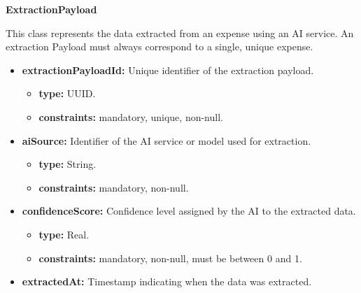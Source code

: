 \textbf{ExtractionPayload}

This class represents the data extracted from an expense using an AI service. An extraction Payload must always correspond to a single, unique expense.

\begin{itemize} [leftmargin=0.75cm, noitemsep, label=\textbullet]

    \item \textbf{extractionPayloadId:} Unique identifier of the extraction payload.
    
    \begin{itemize} [leftmargin=0.75cm, noitemsep, label=$\circ$]

        \item \textbf{type:} UUID.

        \item \textbf{constraints:} mandatory, unique, non-null.

    \end{itemize}

    \item \textbf{aiSource:} Identifier of the AI service or model used for extraction.
    
    \begin{itemize} [leftmargin=0.75cm, noitemsep, label=$\circ$]

        \item \textbf{type:} String.

        \item \textbf{constraints:} mandatory, non-null.

    \end{itemize}

    \item \textbf{confidenceScore:} Confidence level assigned by the AI to the extracted data.
    
    \begin{itemize} [leftmargin=0.75cm, noitemsep, label=$\circ$]

        \item \textbf{type:} Real.

        \item \textbf{constraints:} mandatory, non-null, must be between 0 and 1.

    \end{itemize}

    \item \textbf{extractedAt:} Timestamp indicating when the data was extracted.
    

\end{itemize}
